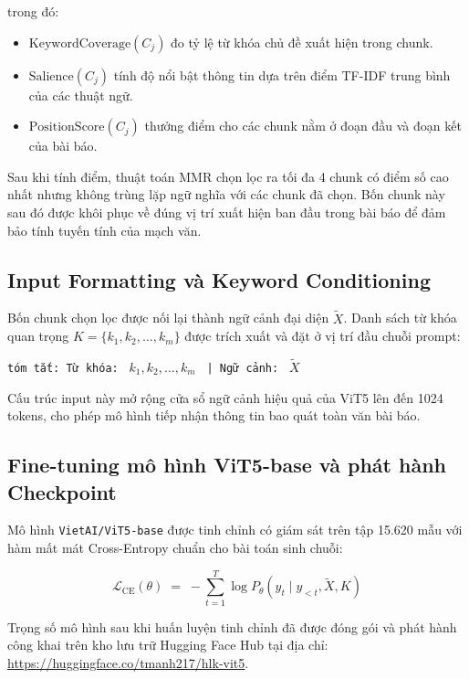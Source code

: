 \noindent trong đó:
\begin{itemize}
  \item $\text{KeywordCoverage}(C_j)$ đo tỷ lệ từ khóa chủ đề xuất hiện trong chunk.
  \item $\text{Salience}(C_j)$ tính độ nổi bật thông tin dựa trên điểm TF-IDF trung bình của các thuật ngữ.
  \item $\text{PositionScore}(C_j)$ thưởng điểm cho các chunk nằm ở đoạn đầu và đoạn kết của bài báo.
\end{itemize}

Sau khi tính điểm, thuật toán MMR chọn lọc ra tối đa 4 chunk có điểm số cao nhất nhưng không trùng lặp ngữ nghĩa với các chunk đã chọn. Bốn chunk này sau đó được khôi phục về đúng vị trí xuất hiện ban đầu trong bài báo để đảm bảo tính tuyến tính của mạch văn.

\subsection{Input Formatting và Keyword Conditioning}

Bốn chunk chọn lọc được nối lại thành ngữ cảnh đại diện $\tilde{X}$. Danh sách từ khóa quan trọng $K = \{k_1, k_2, \ldots, k_m\}$ được trích xuất và đặt ở vị trí đầu chuỗi prompt:

\begin{center}
\texttt{tóm tắt: Từ khóa: } $k_1, k_2, \ldots, k_m$ \texttt{ | Ngữ cảnh: } $\tilde{X}$
\end{center}

Cấu trúc input này mở rộng cửa sổ ngữ cảnh hiệu quả của ViT5 lên đến 1024 tokens, cho phép mô hình tiếp nhận thông tin bao quát toàn văn bài báo.

\subsection{Fine-tuning mô hình ViT5-base và phát hành Checkpoint}

Mô hình \texttt{VietAI/ViT5-base} được tinh chỉnh có giám sát trên tập 15.620 mẫu với hàm mất mát Cross-Entropy chuẩn cho bài toán sinh chuỗi:

\[
\mathcal{L}_{\text{CE}}(\theta) \;=\; -\sum_{t=1}^{T} \log P_\theta(y_t \mid y_{<t}, \tilde{X}, K)
\]

Trọng số mô hình sau khi huấn luyện tinh chỉnh đã được đóng gói và phát hành công khai trên kho lưu trữ Hugging Face Hub tại địa chỉ: \url{https://huggingface.co/tmanh217/hlk-vit5}.

